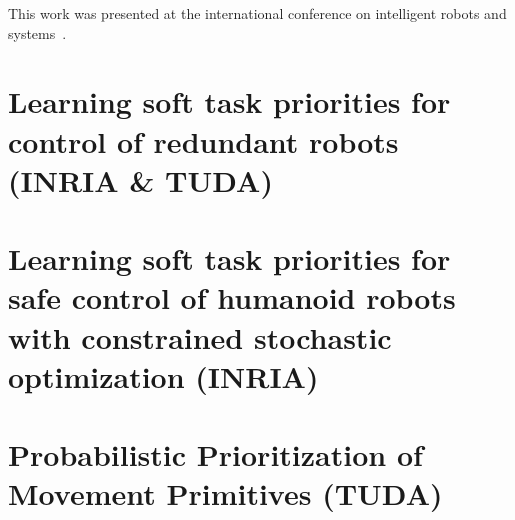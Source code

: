 \documentclass[12pt,a4paper,twoside]{report}
\begin{document}
This work was presented at the international conference on intelligent robots and systems~\cite{lober_IROS2015}.

\chapter{Learning soft task priorities for control of redundant robots (INRIA \& TUDA)}\label{sec:Valerio}


\chapter{Learning soft task priorities for safe control of humanoid robots with
constrained stochastic optimization (INRIA)}\label{sec:Valerio2}


\chapter{Probabilistic Prioritization of Movement Primitives (TUDA)}\label{sec:Alex}




\end{document}
